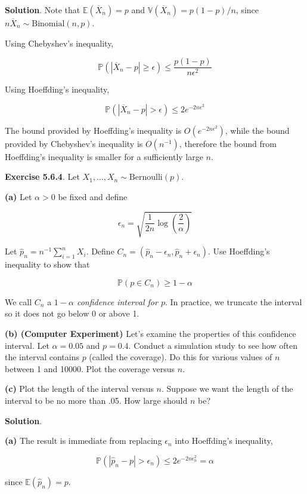 \textbf{Solution}. Note that \(\mathbb{E}(\overline{X}_n) = p\) and
\(\mathbb{V}(\overline{X}_n) = p(1-p) / n\), since
\(n \overline{X}_n \sim \text{Binomial}(n, p)\).

Using Chebyshev's inequality,

\[ \mathbb{P}(|\overline{X}_n - p| \geq \epsilon) \leq \frac{p(1 - p)}{n \epsilon^2} \]

Using Hoeffding's inequality,

\[ \mathbb{P}(|\overline{X}_n - p| > \epsilon) \leq 2e^{-2n\epsilon^2} \]

The bound provided by Hoeffding's inequality is
\(O(e^{-2n\epsilon^2})\), while the bound provided by Chebyshev's
inequality is \(O(n^{-1})\), therefore the bound from Hoeffding's
inequality is smaller for a sufficiently large \(n\).

\textbf{Exercise 5.6.4}. Let
\(X_1, \dots, X_n \sim \text{Bernoulli}(p)\).

\textbf{(a)} Let \(\alpha > 0\) be fixed and define

\[ \epsilon_n = \sqrt{\frac{1}{2n} \log \left( \frac{2}{\alpha}\right)} \]

Let \(\hat{p}_n = n^{-1} \sum_{i=1}^n X_i\). Define
\(C_n = (\hat{p}_n - \epsilon_n, \hat{p}_n + \epsilon_n)\). Use
Hoeffding's inequality to show that

\[ \mathbb{P}(p \in C_n) \geq 1 - \alpha \]

We call \(C_n\) a \emph{\(1 - \alpha\) confidence interval for \(p\)}.
In practice, we truncate the interval so it does not go below 0 or above
1.

\textbf{(b) (Computer Experiment)} Let's examine the properties of this
confidence interval. Let \(\alpha = 0.05\) and \(p = 0.4\). Conduct a
simulation study to see how often the interval contains \(p\) (called
the coverage). Do this for various values of \(n\) between 1 and 10000.
Plot the coverage versus \(n\).

\textbf{(c)} Plot the length of the interval versus \(n\). Suppose we
want the length of the interval to be no more than .05. How large should
\(n\) be?

\textbf{Solution}.

\textbf{(a)} The result is immediate from replacing \(\epsilon_n\) into
Hoeffding's inequality,

\[ \mathbb{P}(|\hat{p}_n - p| > \epsilon_n) \leq 2e^{-2n\epsilon_n^2} = \alpha \]

since \(\mathbb{E}(\hat{p}_n) = p\).

